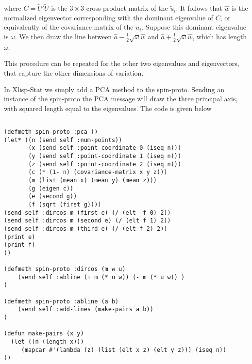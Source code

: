 \documentclass[12pt]{amsart}
\begin{document}
where $C=\tilde U'\tilde U$ is the $3\times 3$ cross-product matrix of
the $\tilde u_{i}$. It follows that $\hat w$ is the normalized
eigenvector corresponding with the dominant eigenvalue of $C$, or
equivalently of the covariance matrix of the $u_{i}$. Suppose this
dominant eigenvalue is $\omega$. We then draw the line between
$\hat a-\frac{1}{2}\sqrt{\omega}\hat w$ and
$\hat a+\frac{1}{2}\sqrt{\omega}\hat w$, which has length $\omega$.
\par
%
This procedure can be repeated for the other two eigenvalues and
eigenvectors, that capture the other dimensions of variation. \par
%
In Xlisp-Stat we simply add a PCA method to the spin-proto. Sending
an instance of the spin-proto the PCA message will draw the three
principal axis, with squared length equal to the eigenvalues. The 
code is given below
%
%
\begin{verbatim}

(defmeth spin-proto :pca ()
(let* ((n (send self :num-points))
       (x (send self :point-coordinate 0 (iseq n)))
       (y (send self :point-coordinate 1 (iseq n)))
       (z (send self :point-coordinate 2 (iseq n)))
       (c (* (1- n) (covariance-matrix x y z)))
       (m (list (mean x) (mean y) (mean z)))
       (g (eigen c))
       (e (second g))
       (f (sqrt (first g))))
(send self :dircos m (first e) (/ (elt  f 0) 2))
(send self :dircos m (second e) (/ (elt f 1) 2))
(send self :dircos m (third e) (/ (elt f 2) 2))
(print e)
(print f)
))

(defmeth spin-proto :dircos (m w u)
	(send self :abline (+ m (* u w)) (- m (* u w)) )
)

(defmeth spin-proto :abline (a b) 
    (send self :add-lines (make-pairs a b))
)

(defun make-pairs (x y)
  (let ((n (length x)))
     (mapcar #'(lambda (z) (list (elt x z) (elt y z))) (iseq n))
))
\end{verbatim}
\end{document}
